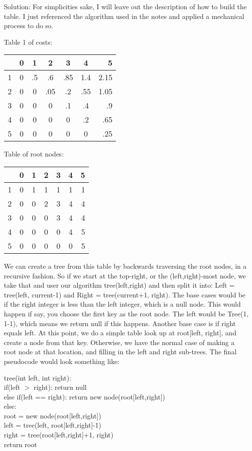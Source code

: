 \documentclass{article}
\begin{document}
\begin{enumerate}
Solution: For simplicities sake, I will leave out the description of how to build the table. I just referenced the algorithm used in the notes and applied a mechanical process to do so.

Table 1 of costs:
\begin{tabular}{ l | c | c | c | c | c | r |  }
  & 0 & 1 & 2 & 3 & 4 & 5 \\ \hline \hline
1 & 0 & .5 & .6 & .85 & 1.4 & 2.15  \\ \hline
2 & 0 & 0 & .05 & .2 & .55 & 1.05  \\ \hline
3 & 0 & 0 & 0 & .1 & .4 & .9  \\ \hline
4 & 0 & 0 & 0 & 0 & .2 & .65  \\ \hline
5 & 0 & 0 & 0 & 0 & 0 & .25  \\ \hline
\end{tabular}
 
Table of root nodes:
\begin{tabular}{ l | c | c | c | c | c | r |  }

  & 0 & 1 & 2 & 3 & 4 & 5 \\ \hline \hline
1 & 0 & 1 & 1 & 1 & 1 & 1  \\ \hline
2 & 0 & 0 & 2 & 3 & 4 & 4  \\ \hline
3 & 0 & 0 & 0 & 3 & 4 & 4  \\ \hline
4 & 0 & 0 & 0 & 0 & 4 & 5  \\ \hline
5 & 0 & 0 & 0 & 0 & 0 & 5  \\ \hline
\end{tabular}

We can create a tree from this table by backwards traversing the root nodes, in a recursive fashion. So if we start at the top-right, or the (left,right)-most node, we take that and user our algorithm tree(left,right) and then split it into: Left = tree(left, current-1) and Right = tree(current+1, right). The base cases would be if the right integer is less than the left integer, which is a null node. This would happen if say, you choose the first key as the root node. The left would be Tree(1, 1-1), which means we return null if this happens. Another base case is if right equals left. At this point, we do a simple table look up at root[left, right], and create a node from that key. Otherwise, we have the normal case of making a root node at that location, and filling in the left and right sub-trees. The final pseudocode would look something like:
\begin{tabbing}
tree(\= int left, int right):\\
\>if(left $>$ right): return null\\
\>else if(left == right): return new node(root[left,right])\\
\>else:\=\\
\>\>root = new node(root[left,right])\\
\>\>left = tree(left, root[left,right]-1)\\
\>\>right = tree(root[left,right]+1, right)\\
\>\>return root\\
\end{tabbing}
\end{enumerate}
\end{document}
